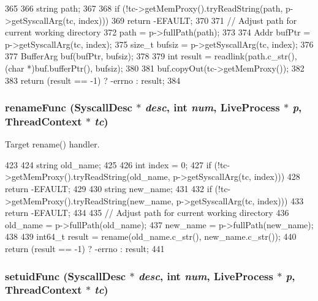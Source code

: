 \begin{DoxyCode}
365 {
366     string path;
367 
368     if (!tc->getMemProxy().tryReadString(path, p->getSyscallArg(tc, index)))
369         return -EFAULT;
370 
371     // Adjust path for current working directory
372     path = p->fullPath(path);
373 
374     Addr bufPtr = p->getSyscallArg(tc, index);
375     size_t bufsiz = p->getSyscallArg(tc, index);
376 
377     BufferArg buf(bufPtr, bufsiz);
378 
379     int result = readlink(path.c_str(), (char *)buf.bufferPtr(), bufsiz);
380 
381     buf.copyOut(tc->getMemProxy());
382 
383     return (result == -1) ? -errno : result;
384 }
\end{DoxyCode}
\hypertarget{syscall__emul_8hh_a7a4679edd20bcb6c6095d9641bf60a41}{
\subsubsection[{renameFunc}]{ renameFunc ({\bf SyscallDesc} $\ast$ {\em desc}, \/  int {\em num}, \/  {\bf LiveProcess} $\ast$ {\em p}, \/  {\bf ThreadContext} $\ast$ {\em tc})}}
\label{syscall__emul_8hh_a7a4679edd20bcb6c6095d9641bf60a41}


Target rename() handler. 


\begin{DoxyCode}
423 {
424     string old_name;
425 
426     int index = 0;
427     if (!tc->getMemProxy().tryReadString(old_name, p->getSyscallArg(tc, index)))
428         return -EFAULT;
429 
430     string new_name;
431 
432     if (!tc->getMemProxy().tryReadString(new_name, p->getSyscallArg(tc, index)))
433         return -EFAULT;
434 
435     // Adjust path for current working directory
436     old_name = p->fullPath(old_name);
437     new_name = p->fullPath(new_name);
438 
439     int64_t result = rename(old_name.c_str(), new_name.c_str());
440     return (result == -1) ? -errno : result;
441 }
\end{DoxyCode}
\hypertarget{syscall__emul_8hh_a5dc53a9bd2d0fac6fedb24a8e50c375d}{
\subsubsection[{setuidFunc}]{ setuidFunc ({\bf SyscallDesc} $\ast$ {\em desc}, \/  int {\em num}, \/  {\bf LiveProcess} $\ast$ {\em p}, \/  {\bf ThreadContext} $\ast$ {\em tc})}}
\label{syscall__emul_8hh_a5dc53a9bd2d0fac6fedb24a8e50c375d}


